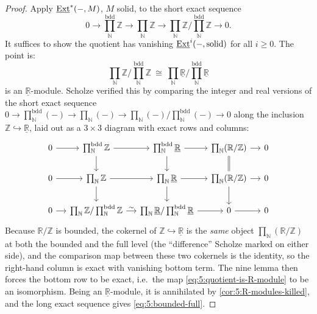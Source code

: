 \begin{proof}
Apply $\underline{\operatorname{Ext}}^{\ast}(-,M)$, $M$ solid, to the short exact sequence
\begin{equation*}
0\longrightarrow\prod_{\mathbb{N}}^{\mathrm{bdd}}\mathbb{Z}
\longrightarrow\prod_{\mathbb{N}}\mathbb{Z}
\longrightarrow\prod_{\mathbb{N}}\mathbb{Z}\Big/\prod_{\mathbb{N}}^{\mathrm{bdd}}\mathbb{Z}
\longrightarrow0 .
\end{equation*}
It suffices to show the quotient has vanishing $\underline{\operatorname{Ext}}^{i}(-,\text{solid})$ for all
$i\ge0$. The point is:
\begin{equation}
\label{eq:5:quotient-is-R-module}
\prod_{\mathbb{N}}\mathbb{Z}\Big/\prod_{\mathbb{N}}^{\mathrm{bdd}}\mathbb{Z}
\ \cong\
\prod_{\mathbb{N}}\underline{\mathbb{R}}\Big/\prod_{\mathbb{N}}^{\mathrm{bdd}}
\underline{\mathbb{R}}
\end{equation}
is an $\underline{\mathbb{R}}$-module. Scholze verified this by comparing the
integer and real versions of the short exact sequence
$0\to\prod_{\mathbb{N}}^{\mathrm{bdd}}(-)\to\prod_{\mathbb{N}}(-)\to
\prod_{\mathbb{N}}(-)\big/\prod_{\mathbb{N}}^{\mathrm{bdd}}(-)\to0$ along the
inclusion $\mathbb{Z}\hookrightarrow\underline{\mathbb{R}}$, laid out as a
$3\times3$ diagram with exact rows and columns:
\[
\begin{tikzcd}[row sep=normal, column sep=small]
0 \arrow[r] & \prod_{\mathbb{N}}^{\mathrm{bdd}}\mathbb{Z} \arrow[r]\arrow[d] & \prod_{\mathbb{N}}^{\mathrm{bdd}}\underline{\mathbb{R}} \arrow[r]\arrow[d] & \prod_{\mathbb{N}}(\mathbb{R}/\mathbb{Z}) \arrow[r]\arrow[d, equal] & 0 \\
0 \arrow[r] & \prod_{\mathbb{N}}\mathbb{Z} \arrow[r]\arrow[d] & \prod_{\mathbb{N}}\underline{\mathbb{R}} \arrow[r]\arrow[d] & \prod_{\mathbb{N}}(\mathbb{R}/\mathbb{Z}) \arrow[r]\arrow[d] & 0 \\
0 \arrow[r] & \prod_{\mathbb{N}}\mathbb{Z}/\prod_{\mathbb{N}}^{\mathrm{bdd}}\mathbb{Z} \arrow[r, "\sim"] & \prod_{\mathbb{N}}\underline{\mathbb{R}}/\prod_{\mathbb{N}}^{\mathrm{bdd}}\underline{\mathbb{R}} \arrow[r] & 0 \arrow[r] & 0
\end{tikzcd}
\]
Because $\mathbb{R}/\mathbb{Z}$ is bounded, the cokernel of
$\mathbb{Z}\hookrightarrow\underline{\mathbb{R}}$ is the \emph{same} object
$\prod_{\mathbb{N}}(\mathbb{R}/\mathbb{Z})$ at both the bounded and the full level
(the ``difference'' Scholze marked on either side), and the comparison map between
these two cokernels is the identity, so the right-hand column is exact with
vanishing bottom term. The nine lemma then forces the bottom row to be exact,
i.e.\ the map \eqref{eq:5:quotient-is-R-module} to be an isomorphism. Being an
$\underline{\mathbb{R}}$-module, it is annihilated by
\cref{cor:5:R-modules-killed}, and the long exact sequence gives \eqref{eq:5:bounded-full}.
\end{proof}


